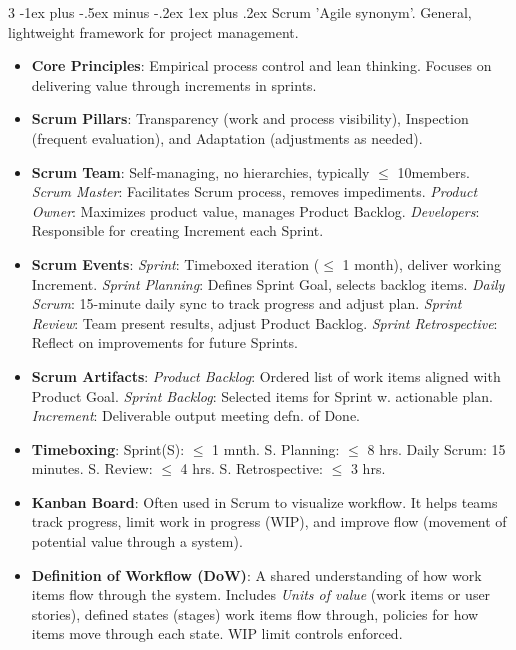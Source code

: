 \documentclass[a4paper, 10pt, landscape]{article}
\makeatletter
\renewcommand{\subsubsection}{\@startsection{subsubsection}{3}{0mm}%
                                {-1ex plus -.5ex minus -.2ex}%
                                {1ex plus .2ex}%
                                {\normalfont\small\bfseries}}
\makeatother
\begin{document}
\begin{multicols*}{3}
\subsubsection{Scrum}
'Agile synonym'. General, lightweight framework for project management. 
\begin{itemize}
	\item \textbf{Core Principles}:  Empirical process control and lean thinking. Focuses on delivering value through increments in sprints.  
	\item \textbf{Scrum Pillars}:  Transparency (work and process visibility), Inspection (frequent evaluation), and Adaptation (adjustments as needed).  
	\item \textbf{Scrum Team}: Self-managing, no hierarchies, typically $\leq$ 10members. \textit{Scrum Master}: Facilitates Scrum process, removes impediments. \textit{Product Owner}: Maximizes product value, manages Product Backlog. \textit{Developers}: Responsible for creating Increment each Sprint.  
	\item \textbf{Scrum Events}:  \textit{Sprint}: Timeboxed iteration ($\leq$ 1 month), deliver working Increment. \textit{Sprint Planning}: Defines Sprint Goal, selects backlog items. \textit{Daily Scrum}: 15-minute daily sync to track progress and adjust plan. \textit{Sprint Review}: Team present results, adjust Product Backlog. \textit{Sprint Retrospective}: Reflect on improvements for future Sprints.  
    \item \textbf{Scrum Artifacts}:  \textit{Product Backlog}: Ordered list of work items aligned with Product Goal. \textit{Sprint Backlog}: Selected items for Sprint w. actionable plan. \textit{Increment}: Deliverable output meeting defn. of Done.  
    \item \textbf{Timeboxing}:  Sprint(S): $\leq$ 1 mnth. S. Planning: $\leq$  8 hrs. Daily Scrum: 15 minutes.  S. Review:  $\leq$  4 hrs. S. Retrospective: $\leq$ 3 hrs.  
    \item \textbf{Kanban Board}: Often used in Scrum to visualize workflow. It helps teams track progress, limit work in progress (WIP), and improve flow (movement of potential value through a system).
    \item \textbf{Definition of Workflow (DoW)}: A shared understanding of how work items flow through the system. Includes \textit{Units of value} (work items or user stories), defined states (stages) work items flow through, policies for how items move through each state. WIP limit controls enforced. 
\end{itemize}


\end{multicols*}
\end{document}
